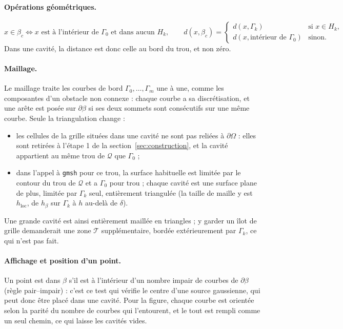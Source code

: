 \documentclass[11pt,a4paper]{article}
\begin{document}
\paragraph{Opérations géométriques.}
\[
x \in \beta_c \iff x \text{ est à l'intérieur de } \Gamma_0
\text{ et dans aucun } H_k ,
\qquad
d(x, \beta_c) =
\begin{cases}
d(x, \Gamma_k) & \text{si } x \in H_k , \\
d(x, \text{intérieur de } \Gamma_0) & \text{sinon.}
\end{cases}
\]
Dans une cavité, la distance est donc celle au bord du trou, et non zéro.

\paragraph{Maillage.} Le maillage traite les courbes de bord
$\Gamma_0, \dots, \Gamma_m$ une à une, comme les composantes d'un obstacle
non connexe : chaque courbe a sa discrétisation, et une arête est posée sur
$\partial\beta$ si ses deux sommets sont consécutifs sur une même courbe.
Seule la triangulation change :
\begin{itemize}
  \item les cellules de la grille situées dans une cavité ne sont pas
        reliées à $\partial\Omega$ : elles sont retirées à l'étape 1 de la
        section~\ref{sec:construction}, et la cavité appartient au même trou
        de $\mathcal{Q}$ que $\Gamma_0$ ;
  \item dans l'appel à \texttt{gmsh} pour ce trou, la surface habituelle est
        limitée par le contour du trou de $\mathcal{Q}$ et a $\Gamma_0$ pour
        trou ; chaque cavité est une surface plane de plus, limitée par
        $\Gamma_k$ seul, entièrement triangulée (la taille de maille y est
        $h_{\mathrm{loc}}$, de $h_\beta$ sur $\Gamma_k$ à $h$ au-delà de
        $\delta$).
\end{itemize}
Une grande cavité est ainsi entièrement maillée en triangles ; y garder un
îlot de grille demanderait une zone $\mathcal{T}$ supplémentaire, bordée
extérieurement par $\Gamma_k$, ce qui n'est pas fait.

\paragraph{Affichage et position d'un point.} Un point est dans $\beta$ s'il
est à l'intérieur d'un nombre impair de courbes de $\partial\beta$ (règle
pair--impair) : c'est ce test qui vérifie le centre d'une source gaussienne,
qui peut donc être placé dans une cavité. Pour la figure, chaque courbe est
orientée selon la parité du nombre de courbes qui l'entourent, et le tout est
rempli comme un seul chemin, ce qui laisse les cavités vides.
\end{document}
